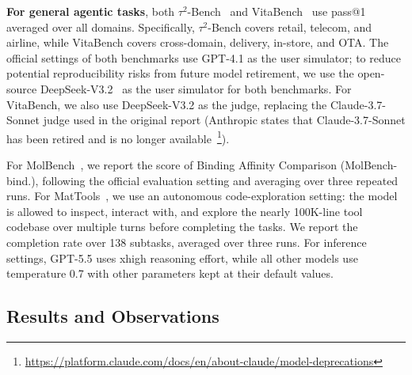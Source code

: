\documentclass{llmxive}
\begin{document}
\textbf{For general agentic tasks}, both $\tau^2$-Bench~\citep{barres2025tau2} and VitaBench~\citep{he2025vitabench} use pass@1 averaged over all domains. Specifically, $\tau^2$-Bench covers retail, telecom, and airline, while VitaBench covers cross-domain, delivery, in-store, and OTA. The official settings of both benchmarks use GPT-4.1 as the user simulator; to reduce potential reproducibility risks from future model retirement, we use the open-source DeepSeek-V3.2~\citep{liu2025deepseek} as the user simulator for both benchmarks. For VitaBench, we also use DeepSeek-V3.2 as the judge, replacing the Claude-3.7-Sonnet judge used in the original report (Anthropic states that Claude-3.7-Sonnet has been retired and is no longer available~\footnote{\url{https://platform.claude.com/docs/en/about-claude/model-deprecations}}). 

For MolBench~\citep{zhang2026molclaw}, we report the score of Binding Affinity Comparison (MolBench-bind.), following the official evaluation setting and averaging over three repeated runs. For MatTools~\citep{MatTools}, we use an autonomous code-exploration setting: the model is allowed to inspect, interact with, and explore the nearly 100K-line tool codebase over multiple turns before completing the tasks. We report the completion rate over 138 subtasks, averaged over three runs. For inference settings, GPT-5.5 uses xhigh reasoning effort, while all other models use temperature 0.7 with other parameters kept at their default values.

\subsection{Results and Observations} 
\end{document}
